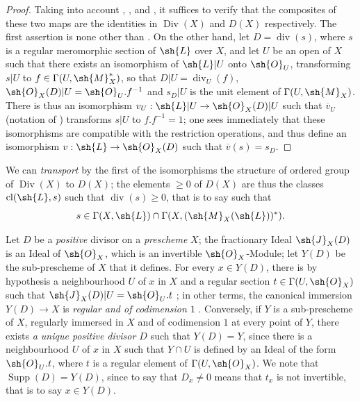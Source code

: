 \begin{proof}
Taking into account , , and , it suffices to verify that the composites of these two maps are the identities in $\operatorname{Div}(X)$ and $D(X)$ respectively.
The first assertion is none other than .
On the other hand, let $D=\operatorname{div}(s)$, where $s$ is a regular meromorphic section of $\sh{L}$ over $X$, and let $U$ be an open of $X$ such that there exists an isomorphism of $\sh{L}|U$ onto $\sh{O}_U$, transforming $s|U$ to $f\in\Gamma(U,\sh{M}_X^*)$, so that $D|U=\operatorname{div}_U(f)$, $\sh{O}_X(D)|U=\sh{O}_U.f^{-1}$ and $s_D|U$ is the unit element of $\Gamma(U,\sh{M}_X)$.
There is thus an isomorphism $v_U:\sh{L}|U\to\sh{O}_X(D)|U$ such that $\overline{v}_U$ (notation of ) transforms $s|U$ to $f.f^{-1}=1$;
one sees immediately that these isomorphisms are compatible with the restriction operations, and thus define an isomorphism $v:\sh{L}\to\sh{O}_X(D)$ such that $\overline{v}(s)=s_D$.
\end{proof}

We can \emph{transport} by the first of the isomorphisms  the structure of ordered group of $\operatorname{Div}(X)$ to $D(X)$;
the elements $\geq 0$ of $D(X)$ are thus the classes $\operatorname{cl}(\sh{L},s)$ such that $\operatorname{div}(s)\geq 0$, that is to say  such that
\[
  s\in\Gamma(X,\sh{L})\cap\Gamma(X,(\sh{M}_X(\sh{L}))^*).
\]

\begin{env}[21.2.12]
\label{IV.21.2.12}
Let $D$ be a \emph{positive} divisor on a \emph{prescheme} $X$;
the fractionary Ideal $\sh{J}_X(D)$ is an Ideal of $\sh{O}_X$, which is an invertible $\sh{O}_X$-Module;
let $Y(D)$ be the sub-prescheme of $X$ that it defines.
For every $x\in Y(D)$, there is by hypothesis a neighbourhood $U$ of $x$ in $X$ and a regular section $t\in\Gamma(U,\sh{O}_X)$ such that $\sh{J}_X(D)|U=\sh{O}_U.t$ ;
in other terms, the canonical immersion $Y(D)\to X$ is \emph{regular and of codimension $1$} .
Conversely, if $Y$ is a sub-prescheme of $X$, regularly immersed in $X$ and of codimension $1$ at every point of $Y$, there exists \emph{a unique positive divisor $D$} such that $Y(D)=Y$, since there is a neighbourhood $U$ of $x$ in $X$ such that $Y\cap U$ is defined by an Ideal of the form $\sh{O}_U.t$, where $t$ is a regular element of $\Gamma(U,\sh{O}_X)$.
We note that $\operatorname{Supp}(D)=Y(D)$, since to say that $D_x\neq 0$ means that $t_x$ is not invertible, that is to say $x\in Y(D)$.
\end{env}


